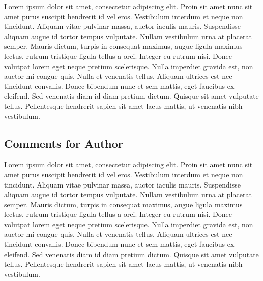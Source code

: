 \documentclass[11pt,letterpaper]{article}
\begin{document}
	Lorem ipsum dolor sit amet, consectetur adipiscing elit. Proin sit amet nunc sit amet purus suscipit hendrerit id vel eros. Vestibulum interdum et neque non tincidunt. Aliquam vitae pulvinar massa, auctor iaculis mauris. Suspendisse aliquam augue id tortor tempus vulputate. Nullam vestibulum urna at placerat semper. Mauris dictum, turpis in consequat maximus, augue ligula maximus lectus, rutrum tristique ligula tellus a orci. Integer eu rutrum nisi. Donec volutpat lorem eget neque pretium scelerisque. Nulla imperdiet gravida est, non auctor mi congue quis. Nulla et venenatis tellus. Aliquam ultrices est nec tincidunt convallis. Donec bibendum nunc et sem mattis, eget faucibus ex eleifend. Sed venenatis diam id diam pretium dictum. Quisque sit amet vulputate tellus. Pellentesque hendrerit sapien sit amet lacus mattis, ut venenatis nibh vestibulum.
	
	\subsection*{Comments for Author}
	
	Lorem ipsum dolor sit amet, consectetur adipiscing elit. Proin sit amet nunc sit amet purus suscipit hendrerit id vel eros. Vestibulum interdum et neque non tincidunt. Aliquam vitae pulvinar massa, auctor iaculis mauris. Suspendisse aliquam augue id tortor tempus vulputate. Nullam vestibulum urna at placerat semper. Mauris dictum, turpis in consequat maximus, augue ligula maximus lectus, rutrum tristique ligula tellus a orci. Integer eu rutrum nisi. Donec volutpat lorem eget neque pretium scelerisque. Nulla imperdiet gravida est, non auctor mi congue quis. Nulla et venenatis tellus. Aliquam ultrices est nec tincidunt convallis. Donec bibendum nunc et sem mattis, eget faucibus ex eleifend. Sed venenatis diam id diam pretium dictum. Quisque sit amet vulputate tellus. Pellentesque hendrerit sapien sit amet lacus mattis, ut venenatis nibh vestibulum.
\end{document}
